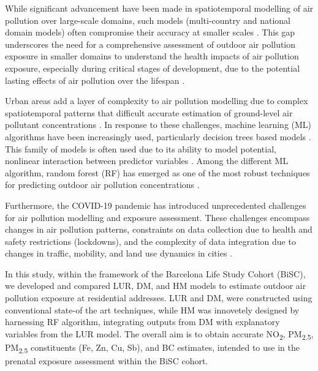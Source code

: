 \documentclass{article}
\begin{document}
While significant advancement have been made in spatiotemporal modelling of air pollution over large-scale domains, such models (multi-country and national domain models) often compromise their accuracy at smaller scales \cite{dehoogh2016, chen2019, chen2020, shen2022}. This gap underscores the need for a comprehensive assessment of outdoor air pollution exposure in smaller domains to understand the health impacts of air pollution exposure, especially during critical stages of development, due to the potential lasting effects of air pollution over the lifespan \cite{selevan2000, wick2010, ghosh2021}. 

Urban areas add a layer of complexity to air pollution modelling due to complex spatiotemporal patterns that difficult accurate estimation of ground-level air pollutant concentrations \cite{sokhi2022}. In response to these challenges, machine learning (ML) algorithms have been increasingly used, particularly decision trees based models \cite{liu2022}. This family of models is often used due to its ability to model potential, nonlinear interaction between predictor variables \cite{liu2022treebased}. Among the different ML algorithm, random forest (RF) has emerged as one of the most robust techniques for predicting outdoor air pollution concentrations \cite{chen2019, chen2020, stafoggia2019, stafoggia2020, schneider2020, mila2023}.

Furthermore, the COVID-19 pandemic has introduced unprecedented challenges for air pollution modelling and exposure assessment. These challenges encompass changes in air pollution patterns, constraints on data collection due to health and safety restrictions (lockdowns), and the complexity of data integration due to changes in traffic, mobility, and land use dynamics in cities \cite{gonzalez2022, querol2021}. 
 
In this study, within the framework of the Barcelona Life Study Cohort (BiSC), we developed and compared LUR, DM, and HM models to estimate outdoor air pollution exposure at residential addresses. LUR and DM, were constructed using conventional state-of the art techniques, while HM was innovetely designed by harnessing RF algorithm, integrating outputs from DM with explanatory variables from the LUR model. The overall aim is to obtain accurate NO\textsubscript{2}, PM\textsubscript{2.5}, PM\textsubscript{2.5} constituents (Fe, Zn, Cu, Sb), and BC estimates, intended to use in the prenatal exposure assessment within the BiSC cohort. 

\end{document}
